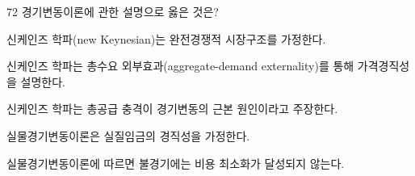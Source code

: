 \begin{question}{72}
경기변동이론에 관한 설명으로 옳은 것은?
\begin{choices}
  \item 신케인즈 학파(new Keynesian)는 완전경쟁적 시장구조를 가정한다.
  \item 신케인즈 학파는 총수요 외부효과(aggregate-demand externality)를 통해 가격경직성을 설명한다.
  \item 신케인즈 학파는 총공급 충격이 경기변동의 근본 원인이라고 주장한다.
  \item 실물경기변동이론은 실질임금의 경직성을 가정한다.
  \item 실물경기변동이론에 따르면 불경기에는 비용 최소화가 달성되지 않는다.
\end{choices}
\end{question}
